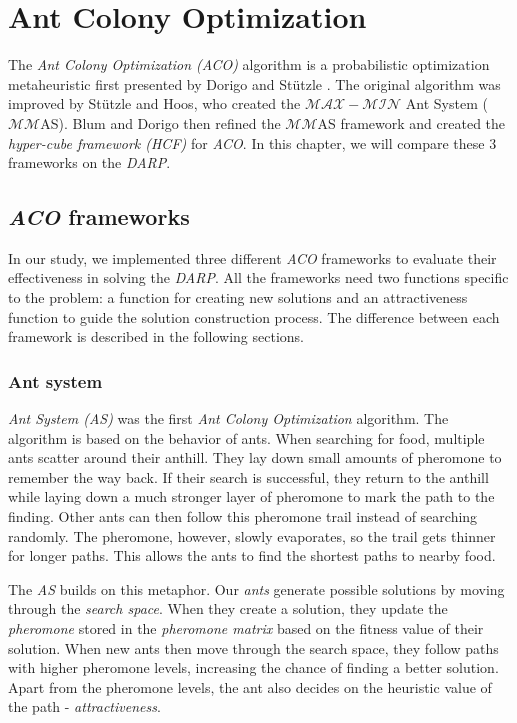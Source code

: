 \chapter{Ant Colony Optimization}\label{ch:aco}

The \textit{Ant Colony Optimization (ACO)} algorithm is a probabilistic optimization metaheuristic first presented by Dorigo and Stützle \cite{Dorigo2010}. The original algorithm was improved by Stützle and Hoos, who created the $\mathcal{MAX}\!{-}\!\mathcal{MIN}$ Ant System ($\mathcal{MM}$AS)\cite{STUTZLE2000889}. Blum and Dorigo then refined the $\mathcal{MM}$AS framework and created the \textit{hyper-cube framework (HCF)} for \textit{ACO}\cite{HCFMMAS}. In this chapter, we will compare these 3 frameworks on the \textit{DARP}.

\section{\textit{ACO} frameworks}

In our study, we implemented three different \textit{ACO} frameworks to evaluate their effectiveness in solving the \textit{DARP}. All the frameworks need two functions specific to the problem: a function for creating new solutions and an attractiveness function to guide the solution construction process. The difference between each framework is described in the following sections.

\subsection{Ant system}

\textit{Ant System (AS)} was the first \textit{Ant Colony Optimization} algorithm. The algorithm is based on the behavior of ants. When searching for food, multiple ants scatter around their anthill. They lay down small amounts of pheromone to remember the way back. If their search is successful, they return to the anthill while laying down a much stronger layer of pheromone to mark the path to the finding. Other ants can then follow this pheromone trail instead of searching randomly. The pheromone, however, slowly evaporates, so the trail gets thinner for longer paths. This allows the ants to find the shortest paths to nearby food.

The \textit{AS} builds on this metaphor. Our \textit{ants} generate possible solutions by moving through the \textit{search space}. When they create a solution, they update the \textit{pheromone} stored in the \textit{pheromone matrix} based on the fitness value of their solution. When new ants then move through the search space, they follow paths with higher pheromone levels, increasing the chance of finding a better solution. Apart from the pheromone levels, the ant also decides on the heuristic value of the path - \textit{attractiveness}.

